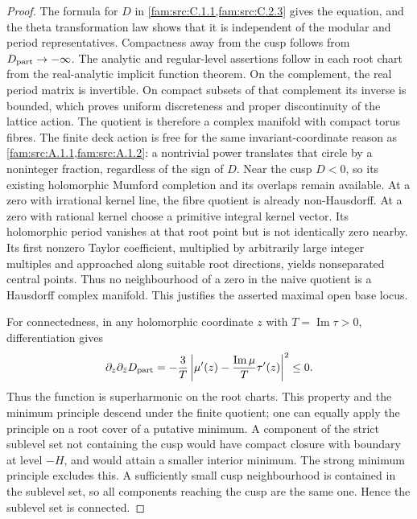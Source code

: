 \begin{proof}
The formula for \(D\) in \cref{fam:src:C.1.1,fam:src:C.2.3} gives the equation, and the theta
transformation law shows that it is independent of the modular and
period representatives. Compactness away from the cusp follows from
\(D_{\rm part}\to-\infty\). The analytic and regular-level
assertions follow in each root chart from the real-analytic implicit
function theorem. On the complement, the real period matrix is
invertible. On compact subsets of that complement its inverse is
bounded, which proves uniform discreteness and proper discontinuity
of the lattice action. The quotient is therefore a complex manifold
with compact torus fibres. The finite deck action is free for the
same invariant-coordinate reason as \cref{fam:src:A.1.1,fam:src:A.1.2}: a nontrivial power translates
that circle by a noninteger fraction, regardless of the sign of
\(D\). Near the cusp \(D<0\), so its existing holomorphic Mumford
completion and its overlaps remain available.
At a zero with irrational kernel line, the fibre quotient is already
non-Hausdorff. At a zero with rational kernel choose a primitive
integral kernel vector. Its holomorphic period vanishes at that root
point but is not identically zero nearby. Its first nonzero Taylor
coefficient, multiplied by arbitrarily large integer multiples and
approached along suitable root directions, yields nonseparated
central points. Thus no neighbourhood of a zero in the naive quotient
is a Hausdorff complex manifold. This justifies the asserted maximal
open base locus.

For connectedness, in any holomorphic coordinate \(z\) with
\(T=\operatorname{Im}\tau>0\), differentiation gives
\[
 \partial_z\partial_{\bar z}D_{\rm part}
 =-\frac3T\left|\mu'(z)-
         \frac{\operatorname{Im}\mu}{T}\tau'(z)\right|^2\le0.
\]
Thus the function is superharmonic on the root charts. This property
and the minimum principle descend under the finite quotient; one
can equally apply the principle on a root cover of a putative
minimum. A component of the strict sublevel set not containing the
cusp would have compact closure with boundary at level \(-H\), and
would attain a smaller interior minimum. The strong minimum
principle excludes this. A sufficiently small cusp neighbourhood is
contained in the sublevel set, so all components reaching the cusp
are the same one. Hence the sublevel set is connected.
\end{proof}

